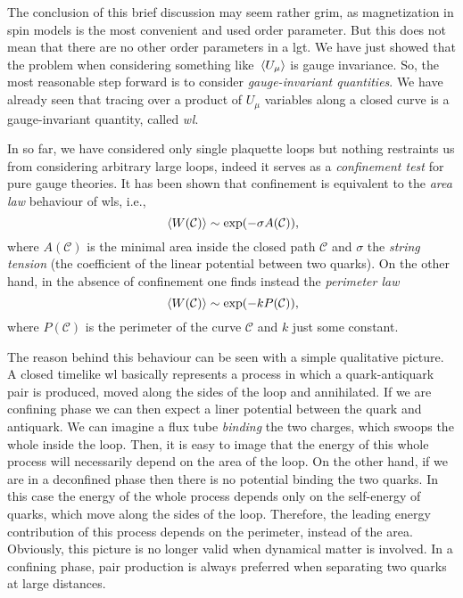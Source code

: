 The conclusion of this brief discussion may seem rather grim, as magnetization in spin models is the most convenient and used order parameter.
But this does not mean that there are no other order parameters in a \ac{lgt}.
We have just showed that the problem when considering something like $\ev*{U_{\mu}}$ is gauge invariance.
So, the most reasonable step forward is to consider \emph{gauge-invariant quantities}.
We have already seen that tracing over a product of $U_{\mu}$ variables along a closed curve is a gauge-invariant quantity, called \emph{\ac{wl}}.

In so far, we have considered only single plaquette loops but nothing restraints us from considering arbitrary large loops, indeed it serves as a \emph{confinement test} for pure gauge theories.
It has been shown \citneeded that confinement is equivalent to the \emph{area law} behaviour of \ac{wl}s, i.e.,
\begin{equation}
    \ev*{W(\mathcal{C})} \sim \exp(- \sigma A(\mathcal{C})),
    \label{eq:wilson_area_law}
\end{equation}
where $A(\mathcal{C})$ is the minimal area inside the closed path $\mathcal{C}$ and $\sigma$ the \emph{string tension} (the coefficient of the linear potential between two quarks).
On the other hand, in the absence of confinement one finds instead the \emph{perimeter law}
\begin{equation}
    \ev*{W(\mathcal{C})} \sim \exp(- k P(\mathcal{C})),
    \label{eq:wilson_perimeter_law}
\end{equation}
where $P(\mathcal{C})$ is the perimeter of the curve $\mathcal{C}$ and $k$ just some constant.

The reason behind this behaviour can be seen with a simple qualitative picture.
A closed timelike \ac{wl} basically represents a process in which a quark-antiquark pair is produced, moved along the sides of the loop and annihilated.
If we are confining phase we can then expect a liner potential between the quark and antiquark.
We can imagine a flux tube \emph{binding} the two charges, which swoops the whole inside the loop.
Then, it is easy to image that the energy of this whole process will necessarily depend on the area of the loop.
On the other hand, if we are in a deconfined phase then there is no potential binding the two quarks.
In this case the energy of the whole process depends only on the self-energy of quarks, which move along the sides of the loop.
Therefore, the leading energy contribution of this process depends on the perimeter, instead of the area.
Obviously, this picture is no longer valid when dynamical matter is involved.
In a confining phase, pair production is always preferred when separating two quarks at large distances.


